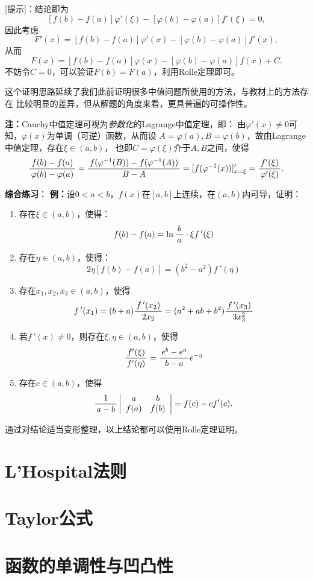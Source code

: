 [提示]：结论即为
$$[f(b)-f(a)]\varphi'(\xi)-[\varphi(b)-\varphi(a)]f'(\xi)=0,$$
因此考虑
$$F'(x)=[f(b)-f(a)]\varphi'(x)-[\varphi(b)-\varphi(a)]f'(x),$$
从而
$$F(x)=[f(b)-f(a)]\varphi(x)-[\varphi(b)-\varphi(a)]f(x)+C.$$
不妨令$C=0$，可以验证$F(b)=F(a)$，利用Rolle定理即可。

这个证明思路延续了我们此前证明很多中值问题所使用的方法，与教材上的方法存在
比较明显的差异，但从解题的角度来看，更具普遍的可操作性。

{\bf 注：}Cauchy中值定理可视为{\it 参数化}的Lagrange中值定理，即：
由$\varphi'(x)\ne 0$可知，$\varphi(x)$为单调（可逆）函数，从而设
$A=\varphi(a),B=\varphi(b)$，故由Lagrange中值定理，存在$\xi\in(a,b)$，
也即$C=\varphi(\xi)$介于$A,B$之间，使得
$$\displaystyle\frac{\,{f(b)-f(a)}\,}{\,{\varphi(b)-\varphi(a)}\,}
=\displaystyle\frac{\,{f(\varphi^{-1}(B))-f(\varphi^{-1}(A))}\,}{\,{B-A}\,}
=[f(\varphi^{-1}(x))]'_{x=\xi}=\displaystyle\frac{\,{f'(\xi)}\,}{\,{\varphi'(\xi)}\,}.$$

{\bf 综合练习}：
{\bf 例：}设$0<a<b$，$f(x)$在$[a,b]$上连续，在$(a,b)$内可导，证明：
\begin{enumerate}[(1)]
  \setlength{\itemindent}{1cm}
  \item 存在$\xi\in(a,b)$，使得：
	$$f(b)-f(a)=\ln\displaystyle\frac{\,{b}\,}{\,{a}\,}\cdot \xi f\,'(\xi)$$
  \item 存在$\eta\in(a,b)$，使得：
    $$2\eta[f(b)-f(a)]=(b^2-a^2)f\,'(\eta)$$
  \item 存在$x_1,x_2,x_3\in(a,b)$，使得
	$$f\,'(x_1)=(b+a)\displaystyle\frac{\,{f\,'(x_2)}\,}{\,{2x_2}\,}=(a^2+ab+b^2)
	\displaystyle\frac{\,{f\,'(x_3)}\,}{\,{3x_3^2}\,}$$ 
  \item 若$f\,'(x)\ne 0$，则存在$\xi,\eta\in(a,b)$，使得
	$$\displaystyle\frac{\,{f'(\xi)}\,}{\,{f'(\eta)}\,}=\displaystyle\frac{\,{e^b-e^a}\,}{\,{b-a}\,}e^{-\eta}$$
  \item 存在$c\in(a,b)$，使得
	$$\displaystyle\frac{\,{1}\,}{\,{a-b}\,}\left|\begin{array}{cc}
	a & b\\ f(a) & f(b)
	\end{array}\right|=f(c)-cf'(c).$$
\end{enumerate}

通过对结论适当变形整理，以上结论都可以使用Rolle定理证明。

\section{L'Hospital法则}

\section{Taylor公式}

\section{函数的单调性与凹凸性}

